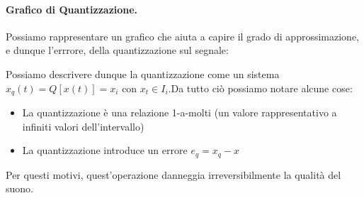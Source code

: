 \paragraph{Grafico di Quantizzazione.}Possiamo rappresentare un grafico che aiuta a capire il grado di approssimazione,
e dunque l'errrore, della quantizzazione sul segnale:\\

Possiamo descrivere dunque la quantizzazione come un sistema $x_q(t) = Q[x(t)] = x_i$ con $x_t \in I_i$.Da tutto ciò possiamo
notare alcune cose:
\begin{itemize}
    \item La quantizzazione è una relazione 1-a-molti (un valore rappresentativo a infiniti valori dell'intervallo)
    \item La quantizzazione introduce un errore $e_q = x_q - x$
\end{itemize}
Per questi motivi, quest'operazione danneggia irreversibilmente la qualità del suono.

